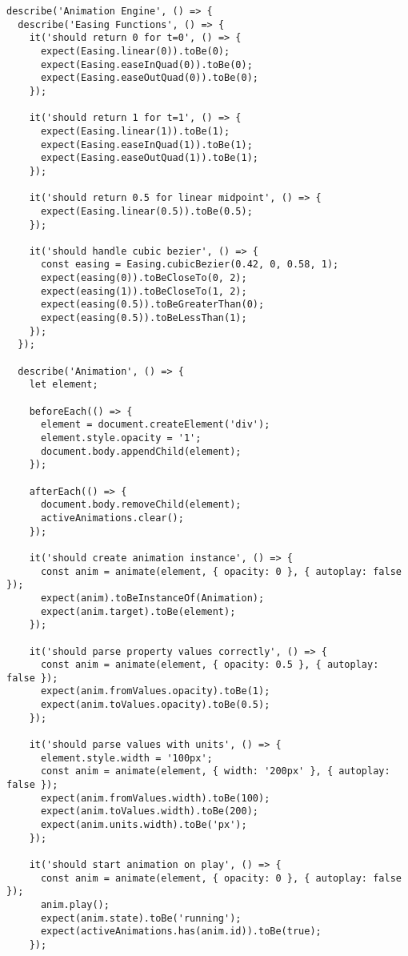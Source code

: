 \documentclass[11pt]{article}
\begin{document}
\begin{verbatim}
describe('Animation Engine', () => {
  describe('Easing Functions', () => {
    it('should return 0 for t=0', () => {
      expect(Easing.linear(0)).toBe(0);
      expect(Easing.easeInQuad(0)).toBe(0);
      expect(Easing.easeOutQuad(0)).toBe(0);
    });
    
    it('should return 1 for t=1', () => {
      expect(Easing.linear(1)).toBe(1);
      expect(Easing.easeInQuad(1)).toBe(1);
      expect(Easing.easeOutQuad(1)).toBe(1);
    });
    
    it('should return 0.5 for linear midpoint', () => {
      expect(Easing.linear(0.5)).toBe(0.5);
    });
    
    it('should handle cubic bezier', () => {
      const easing = Easing.cubicBezier(0.42, 0, 0.58, 1);
      expect(easing(0)).toBeCloseTo(0, 2);
      expect(easing(1)).toBeCloseTo(1, 2);
      expect(easing(0.5)).toBeGreaterThan(0);
      expect(easing(0.5)).toBeLessThan(1);
    });
  });
  
  describe('Animation', () => {
    let element;
    
    beforeEach(() => {
      element = document.createElement('div');
      element.style.opacity = '1';
      document.body.appendChild(element);
    });
    
    afterEach(() => {
      document.body.removeChild(element);
      activeAnimations.clear();
    });
    
    it('should create animation instance', () => {
      const anim = animate(element, { opacity: 0 }, { autoplay: false });
      expect(anim).toBeInstanceOf(Animation);
      expect(anim.target).toBe(element);
    });
    
    it('should parse property values correctly', () => {
      const anim = animate(element, { opacity: 0.5 }, { autoplay: false });
      expect(anim.fromValues.opacity).toBe(1);
      expect(anim.toValues.opacity).toBe(0.5);
    });
    
    it('should parse values with units', () => {
      element.style.width = '100px';
      const anim = animate(element, { width: '200px' }, { autoplay: false });
      expect(anim.fromValues.width).toBe(100);
      expect(anim.toValues.width).toBe(200);
      expect(anim.units.width).toBe('px');
    });
    
    it('should start animation on play', () => {
      const anim = animate(element, { opacity: 0 }, { autoplay: false });
      anim.play();
      expect(anim.state).toBe('running');
      expect(activeAnimations.has(anim.id)).toBe(true);
    });
    

\end{verbatim}
\end{document}
